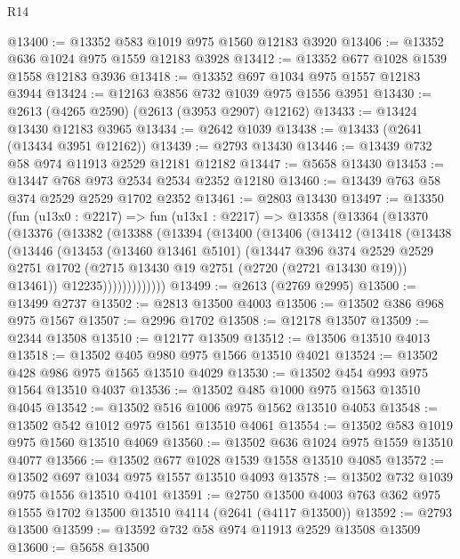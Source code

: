 \begin{lexlean}{R14}
\begin{coremodule}
@13400 := @13352 @583 @1019 @975 @1560 @12183 @3920
@13406 := @13352 @636 @1024 @975 @1559 @12183 @3928
@13412 := @13352 @677 @1028 @1539 @1558 @12183 @3936
@13418 := @13352 @697 @1034 @975 @1557 @12183 @3944
@13424 := @12163 @3856 @732 @1039 @975 @1556 @3951
@13430 := @2613 (@4265 @2590) (@2613 (@3953 @2907) @12162)
@13433 := @13424 @13430 @12183 @3965
@13434 := @2642 @1039
@13438 := @13433 (@2641 (@13434 @3951 @12162))
@13439 := @2793 @13430
@13446 := @13439 @732 @58 @974 @11913 @2529 @12181 @12182
@13447 := @5658 @13430
@13453 := @13447 @768 @973 @2534 @2534 @2352 @12180
@13460 := @13439 @763 @58 @374 @2529 @2529 @1702 @2352
@13461 := @2803 @13430
@13497 := @13350
    (fun (u13x0 : @2217) =>
    fun (u13x1 : @2217) =>
    @13358
      (@13364
        (@13370
          (@13376
            (@13382
              (@13388
                (@13394
                  (@13400
                    (@13406
                      (@13412
                        (@13418
                          (@13438
                            (@13446
                              (@13453
                                (@13460 @13461 @5101)
                                (@13447
                                  @396
                                  @374
                                  @2529
                                  @2529
                                  @2751
                                  @1702
                                  (@2715 @13430 @19 @2751 (@2720 (@2721 @13430 @19)))
                                  @13461))
                              @12235)))))))))))))
@13499 := @2613 (@2769 @2995)
@13500 := @13499 @2737
@13502 := @2813 @13500 @4003
@13506 := @13502 @386 @968 @975 @1567
@13507 := @2996 @1702
@13508 := @12178 @13507
@13509 := @2344 @13508
@13510 := @12177 @13509
@13512 := @13506 @13510 @4013
@13518 := @13502 @405 @980 @975 @1566 @13510 @4021
@13524 := @13502 @428 @986 @975 @1565 @13510 @4029
@13530 := @13502 @454 @993 @975 @1564 @13510 @4037
@13536 := @13502 @485 @1000 @975 @1563 @13510 @4045
@13542 := @13502 @516 @1006 @975 @1562 @13510 @4053
@13548 := @13502 @542 @1012 @975 @1561 @13510 @4061
@13554 := @13502 @583 @1019 @975 @1560 @13510 @4069
@13560 := @13502 @636 @1024 @975 @1559 @13510 @4077
@13566 := @13502 @677 @1028 @1539 @1558 @13510 @4085
@13572 := @13502 @697 @1034 @975 @1557 @13510 @4093
@13578 := @13502 @732 @1039 @975 @1556 @13510 @4101
@13591 := @2750 @13500 @4003 @763 @362 @975 @1555 @1702 @13500 @13510 @4114 (@2641 (@4117 @13500))
@13592 := @2793 @13500
@13599 := @13592 @732 @58 @974 @11913 @2529 @13508 @13509
@13600 := @5658 @13500

\end{coremodule}
\end{lexlean}
